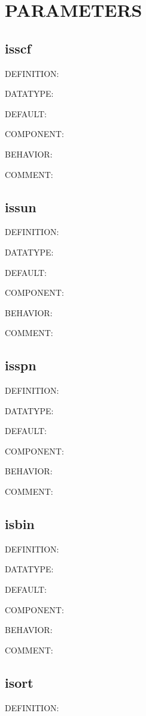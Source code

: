 \chapter{PARAMETERS}
\section{isscf}

{\color{red}DEFINITION:}

{\color{green}DATATYPE:}

{\color{blue}DEFAULT:}

{\color{brown}COMPONENT:}

{\color{purple}BEHAVIOR:}

{\color{olive}COMMENT:}

\section{issun}
{\color{red}DEFINITION:}

{\color{green}DATATYPE:}

{\color{blue}DEFAULT:}

{\color{brown}COMPONENT:}

{\color{purple}BEHAVIOR:}

{\color{olive}COMMENT:}

\section{isspn}
{\color{red}DEFINITION:}

{\color{green}DATATYPE:}

{\color{blue}DEFAULT:}

{\color{brown}COMPONENT:}

{\color{purple}BEHAVIOR:}

{\color{olive}COMMENT:}

\section{isbin}
{\color{red}DEFINITION:}

{\color{green}DATATYPE:}

{\color{blue}DEFAULT:}

{\color{brown}COMPONENT:}

{\color{purple}BEHAVIOR:}

{\color{olive}COMMENT:}

\section{isort}
{\color{red}DEFINITION:}

